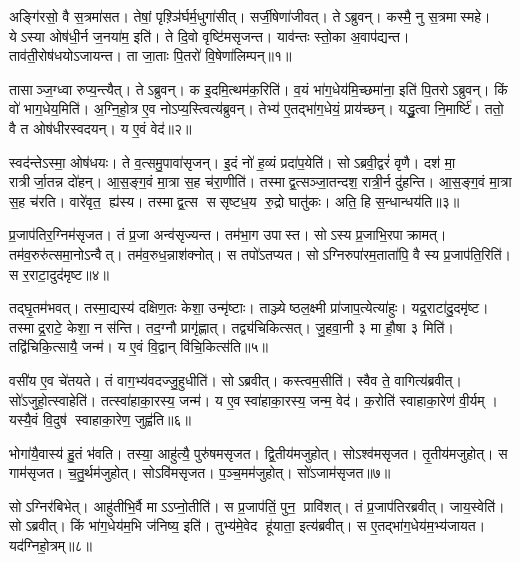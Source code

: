\setcounter{anuvakam}{0}

अङ्गि॑रसो॒ वै स॒त्रमा॑सत।
तेषां॒ पृश़्ञि॑र्घर्म॒धुगा॑सीत्।
सर्जी॒षेणा॑जीवत्।
तेऽब्रुवन्।
कस्मै॒ नु स॒त्रमास्महे।
येऽस्या ओष॑धी॒र्न ज॒नया॑म॒ इति॑।
ते दि॒वो वृष्टि॑मसृजन्त।
याव॑न्तः स्तो॒का अ॒वाप॑द्यन्त।
ताव॑ती॒रोष॑धयोऽजायन्त।
ता जा॒ताः पि॒तरो॑ वि॒षेणा॑लिम्पन्॥१॥

तासाञ्ज॒ग्ध्वा रुप्य॒न्त्यैत्।
तेऽब्रुवन्।
क इ॒दमि॒त्थम॑क॒रिति॑।
व॒यं भा॑ग॒धेय॑मि॒च्छमा॑ना॒ इति॑ पि॒तरोऽब्रुवन्।
किं वो॑ भाग॒धेय॒मिति॑।
अ॒ग्नि॒हो॒त्र ए॒व नोऽप्य॒स्त्वित्य॑ब्रुवन्।
तेभ्य॑ ए॒तद्भा॑ग॒धेयं॒ प्राय॑च्छन्।
यद्धु॒त्वा नि॒मार्ष्टि॑।
ततो॒ वै त ओष॑धीरस्वदयन्।
य ए॒वं वेद॑॥२॥

स्वद॑न्तेऽस्मा॒ ओष॑धयः।
ते व॒त्समु॒पावा॑सृजन्।
इ॒दं नो॑ ह॒व्यं प्रदा॑प॒येति॑।
सोऽब्रवी॒द्वरं॑ वृणै।
दश॑ मा॒ रात्रीर्जा॒तन्न दो॑हन्।
आ॒स॒ङ्ग॒वं मा॒त्रा स॒ह च॑रा॒णीति॑।
तस्माद्व॒त्सञ्जा॒तन्दश॒ रात्री॒र्न दु॑हन्ति।
आ॒स॒ङ्ग॒वं मा॒त्रा स॒ह च॑रति।
वारे॑वृत॒ ह्य॑स्य।
तस्माद्व॒त्स ससृष्टध॒य रु॒द्रो घातु॑कः।
अति॒ हि स॒न्धान्धय॑ति॥३॥\anuvakamend[अ॒लि॒म्प॒न्वेद॒ घातु॑क॒ एकं च]

प्र॒जाप॑तिर॒ग्निम॑सृजत।
तं प्र॒जा अन्व॑सृज्यन्त।
तम॑भा॒ग उपास्त।
सोऽस्य प्र॒जाभि॒रपाक्रामत्।
तम॑व॒रुरु॑त्समा॒नोऽन्वैत्।
तम॑व॒रुध॒न्नाश॑क्नोत्।
स तपो॑ऽतप्यत।
सोऽग्निरुपा॑रम॒ताता॑पि॒ वै स्य प्र॒जाप॑ति॒रिति॑।
स र॒राटा॒दुद॑मृष्ट॥४॥

तद्घृ॒तम॑भवत्।
तस्मा॒द्यस्य॑ दक्षिण॒तः केशा॒ उन्मृ॑ष्टाः।
ताञ्ज्येष्ठल॒क्ष्मी प्रा॑जाप॒त्येत्या॑हुः।
यद्र॒राटा॑दु॒दमृ॑ष्ट।
तस्माद्र॒राटे॒ केशा॒ न स॑न्ति।
तद॒ग्नौ प्रागृ॑ह्णात्।
तद्व्य॑चिकित्सत्।
जु॒हवा॒नी ३ मा हौ॒षा ३ मिति॑।
तद्वि॑चिकि॒त्सायै॒ जन्म॑।
य ए॒वं वि॒द्वान् वि॑चि॒कित्स॑ति॥५॥

वसी॑य ए॒व चे॑तयते।
तं वाग॒भ्य॑वदज्जु॒हुधीति॑।
सोऽब्रवीत्।
कस्त्वम॒सीति॑।
स्वैव ते॒ वागित्य॑ब्रवीत्।
सो॑ऽजुहो॒त्स्वाहेति॑।
तत्स्वा॑हाका॒रस्य॒ जन्म॑।
य ए॒वस्वा॑हाका॒रस्य॒ जन्म॒ वेद॑।
क॒रोति॑ स्वाहाका॒रेण॑ वी॒र्यम्।
यस्यै॒वं वि॒दुष॑ स्वाहाका॒रेण॒ जुह्व॑ति॥६॥

भोगा॑यै॒वास्य॑ हु॒तं भ॑वति।
तस्या॒ आहु॑त्यै॒ पुरु॑षमसृजत।
द्वि॒तीय॑मजुहोत्।
सोऽश्व॑मसृजत।
तृ॒तीय॑मजुहोत्।
स गाम॑सृजत।
च॒तु॒र्थम॑जुहोत्।
सोऽवि॑मसृजत।
प॒ञ्च॒मम॑जुहोत्।
सो॑ऽजाम॑सृजत॥७॥

सोऽग्निर॑बिभेत्।
आहु॑तीभि॒र्वै माऽऽप्नो॒तीति॑।
स प्र॒जाप॑तिं॒ पुन॒ प्रावि॑शत्।
तं प्र॒जाप॑तिरब्रवीत्।
जाय॒स्वेति॑।
सोऽब्रवीत्।
किं भा॑ग॒धेय॑म॒भि ज॑निष्य॒ इति॑।
तुभ्य॑मे॒वेद हू॑याता॒ इत्य॑ब्रवीत्।
स ए॒तद्भा॑ग॒धेय॑म॒भ्य॑जायत।
यद॑ग्निहो॒त्रम्॥८॥

